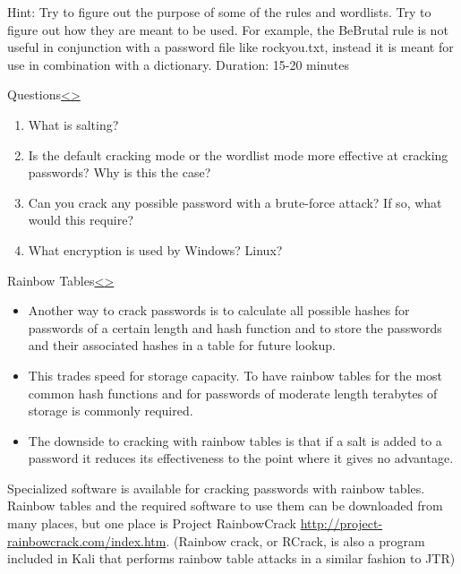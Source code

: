 \documentclass[12pt]{article}
\newenvironment{instructionblock}{\Large\bgroup}{\egroup}
\begin{document}
Hint: Try to figure out the purpose of some of the rules and wordlists. Try to figure out how they are meant to be used. For example, the BeBrutal rule is not useful in conjunction with a password file like rockyou.txt, instead it is meant for use in combination with a dictionary.
\vfill
Duration: 15-20 minutes

\pagebreak
\begin{slide}{Questions}{\hyperref[slide 21]{\textless}\hyperref[slide 23]{\textgreater}}
	\vskip 10pt
	\begin{instructionblock}
		\begin{enumerate}
			\item What is salting?
			\item Is the default cracking mode or the wordlist mode more effective at cracking passwords? Why is this the case?
			\item Can you crack any possible password with a brute-force attack? If so, what would this require?
			\item What encryption is used by Windows? Linux?
		\end{enumerate}
	\end{instructionblock}
\end{slide}

\vfill	

\pagebreak
\begin{slide}{Rainbow Tables}{\hyperref[slide 22]{\textless}\hyperref[slide 24]{\textgreater}}
\begin{instructionblock}
\begin{itemize}
\item Another way to crack passwords is to calculate all possible hashes for passwords of a certain length and hash function and to store the passwords and their associated hashes in a table for future lookup. 
\item This trades speed for storage capacity. To have rainbow tables for the most common hash functions and for passwords of moderate length terabytes of storage is commonly required.
\item The downside to cracking with rainbow tables is that if a salt is added to a password it reduces its effectiveness to the point where it gives no advantage.
\end{itemize}
\end{instructionblock}
\end{slide}
\cite{rainbowcrack}
\vfill
Specialized software is available for cracking passwords with rainbow tables. Rainbow tables and the required software to use them can be downloaded from many places, but one place is Project RainbowCrack \url{http://project-rainbowcrack.com/index.htm}.\cite{rainbowcrack} (Rainbow crack, or RCrack, is also a program included in Kali that performs rainbow table attacks in a similar fashion to JTR)
\end{document}
